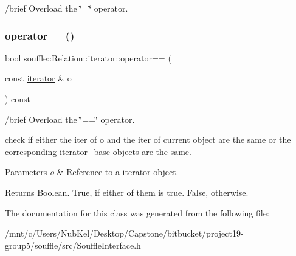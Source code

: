 /brief Overload the \char`\"{}=\char`\"{} operator. \mbox{\label{classsouffle_1_1_relation_1_1iterator_a2028555cc6870836362a2cf16b09bbdf}} 
\subsubsection{\texorpdfstring{operator==()}{operator==()}}
{\footnotesize\ttfamily bool souffle\+::\+Relation\+::iterator\+::operator== (\begin{DoxyParamCaption}\item[{const \hyperlink{classsouffle_1_1_relation_1_1iterator}{iterator} \&}]{o }\end{DoxyParamCaption}) const\hspace{0.3cm}{\ttfamily [inline]}}

/brief Overload the \char`\"{}==\char`\"{} operator.

check if either the iter of o and the iter of current object are the same or the corresponding \hyperlink{classsouffle_1_1_relation_1_1iterator__base}{iterator\+\_\+base} objects are the same. 
\begin{DoxyParams}{Parameters}
{\em o} & Reference to a iterator object. \\
\hline
\end{DoxyParams}
\begin{DoxyReturn}{Returns}
Boolean. True, if either of them is true. False, otherwise. 
\end{DoxyReturn}


The documentation for this class was generated from the following file\+:\begin{DoxyCompactItemize}
\item 
/mnt/c/\+Users/\+Nub\+Kel/\+Desktop/\+Capstone/bitbucket/project19-\/group5/souffle/src/Souffle\+Interface.\+h\end{DoxyCompactItemize}
